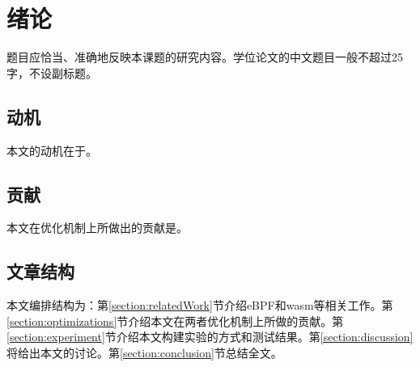 
\section{绪论}
题目应恰当、准确地反映本课题的研究内容。学位论文的中文题目一般不超过25字，不设副标题。
\subsection{动机}
本文的动机在于。
\subsection{贡献}
本文在优化机制上所做出的贡献是。
\subsection{文章结构}
本文编排结构为：第\ref{section:relatedWork}节介绍eBPF和wasm等相关工作。第\ref{section:optimizations}节介绍本文在两者优化机制上所做的贡献。第\ref{section:experiment}节介绍本文构建实验的方式和测试结果。第\ref{section:discussion}将给出本文的讨论。第\ref{section:conclusion}节总结全文。
